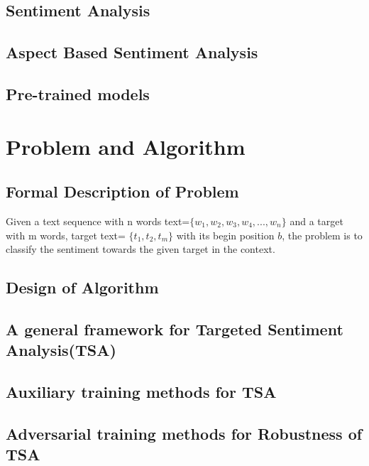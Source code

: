 \documentclass[fyp]{socreport}
\begin{document}
\section{Sentiment Analysis}



\section{Aspect Based Sentiment Analysis}

\section{Pre-trained models}







\chapter{Problem and Algorithm}
\section{Formal Description of Problem}
Given a text sequence with n words text=$\{w_1,w_2,w_3,w_4,...,w_n\}$ and a target with m words, target text=  $\{t_1,t_2,t_m\}$ with its begin position $b$, the problem is to classify the sentiment towards the given target in the context.


\section{Design of Algorithm}
\section{A general framework for Targeted Sentiment Analysis(TSA)}



\section{Auxiliary training methods for TSA}


\section{Adversarial training methods for Robustness of TSA}
\end{document}
